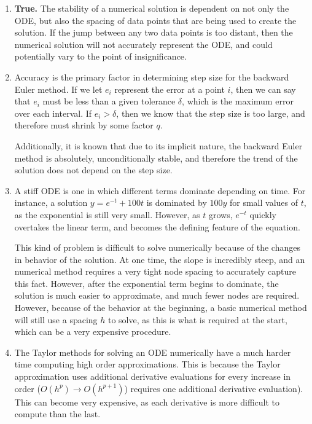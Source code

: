 \documentclass[11pt]{article}
\begin{document}
\begin{enumerate}
\begin{enumerate}
		\medskip

		\item \textbf{True.} The stability of a numerical solution is dependent on not only the ODE, but also the spacing of data points that are being used to create the solution. If the jump between any two data points is too distant, then the numerical solution will not accurately represent the ODE, and could potentially vary to the point of insignificance.

		\medskip

		\item Accuracy is the primary factor in determining step size for the backward Euler method. If we let $e_i$ represent the error at a point $i$, then we can say that $e_i$ must be less than a given tolerance $\delta$, which is the maximum error over each interval. If $e_i > \delta$, then we know that the step size is too large, and therefore must shrink by some factor $q$.

		Additionally, it is known that due to its implicit nature, the backward Euler method is absolutely, unconditionally stable, and therefore the trend of the solution does not depend on the step size.

		\medskip

		\item A stiff ODE is one in which different terms dominate depending on time. For instance, a solution $y=e^{-t} + 100t$ is dominated by $100y$ for small values of $t$, as the exponential is still very small. However, as $t$ grows, $e^{-t}$ quickly overtakes the linear term, and becomes the defining feature of the equation.

		This kind of problem is difficult to solve numerically because of the changes in behavior of the solution. At one time, the slope is incredibly steep, and an numerical method requires a very tight node spacing to accurately capture this fact. However, after the exponential term begins to dominate, the solution is much easier to approximate, and much fewer nodes are required. However, because of the behavior at the beginning, a basic numerical method will still use a spacing $h$ to solve, as this is what is required at the start, which can be a very expensive procedure.

		\medskip

		\item The Taylor methods for solving an ODE numerically have a much harder time computing high order approximations. This is because the Taylor approximation uses additional derivative evaluations for every increase in order ($O(h^p)\to O(h^{p+1})$) requires one additional derivative evaluation). This can become very expensive, as each derivative is more difficult to compute than the last.


\end{enumerate}
\end{enumerate}
\end{document}

